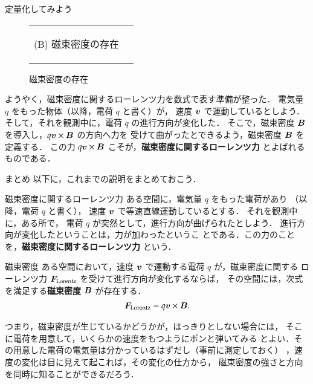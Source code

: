 \begin{mysmallsec}{定量化してみよう}
\begin{figure}[hbt]
\begin{tabular}{cc}
\begin{minipage}{0.5\hsize}
\begin{center}
                        (B) 磁束密度の存在
                    \end{center}
                \end{minipage}
            \end{tabular}
                        \caption{磁束密度の存在}
                        \label{fig:MgField_def}
        \end{figure}

        ようやく，磁束密度に関するローレンツ力を数式で表す準備が整った．
        電気量 $q$ をもった物体（以降，電荷 $q$ と書く）が，
        速度 $\boldsymbol{v}$ で運動しているとしよう．
        そして，それを観測中に，電荷 $q$ の進行方向が変化した．
        そこで，磁束密度 $\boldsymbol{B}$ を導入し，$q\boldsymbol{v}\times\boldsymbol{B}$ の方向へ力を
        受けて曲がったとできるよう，磁束密度 $\boldsymbol{B}$ を定義する．
        この力 $q\boldsymbol{v}\times\boldsymbol{B}$ こそが，\textbf{磁束密度に関するローレンツ力} とよばれる
        ものである．
    \end{mysmallsec}

    \begin{mysmallsec}{まとめ}
        以下に，これまでの説明をまとめておこう．
        \begin{myshadebox}{磁束密度に関するローレンツ力}
                ある空間に，電気量 $q$ をもった電荷があり
                （以降，電荷 $q$ と書く），
                速度 $\boldsymbol{v}$ で等速直線運動しているとする．
                それを観測中に，ある所で，
                電荷 $q$ が突然として，進行方向が曲げられたとしよう．
                進行方向が変化したということは，力が加わったというこ
                とである．この力のことを，\textbf{磁束密度に関するローレンツ力} という．
        \end{myshadebox}
        \begin{myshadebox}{磁束密度}
                ある空間において，速度 $\boldsymbol{v}$ で運動する電荷 $q$ が，磁束密度に関する
                ローレンツ力 $\boldsymbol{F}_{\mathrm{Lorentz}}$ を受けて進行方向が変化するならば，
                その空間には，次式を満足する\textbf{磁束密度} $\boldsymbol{B}$ が存在する．
                    \begin{align}
                        \boldsymbol{F}_{\mathrm{Lorentz}} = q\boldsymbol{v}\times\boldsymbol{B}.
                    \end{align}
        \end{myshadebox}

        つまり，磁束密度が生じているかどうかが，はっきりとしない場合には，
        そこに電荷を用意して，いくらかの速度をもつようにポンと弾いてみる
        とよい．その用意した電荷の電気量は分かっているはずだし（事前に測定しておく）
        ，速度の変化は目に見えて起これば，その変化の仕方から，
        磁束密度の強さと方向を同時に知ることができるだろう．
    \end{mysmallsec}

